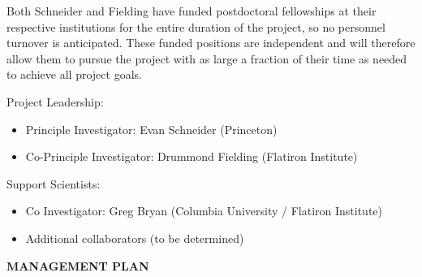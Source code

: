 \documentclass[11pt,letterpaper,english]{article}
\begin{document}
\begin{flushleft}
Both Schneider and Fielding have funded postdoctoral fellowships at their respective institutions for the entire duration of the project, so no personnel turnover is anticipated.  These funded positions are independent and will therefore allow them to pursue the project with as large a fraction of their time as needed to achieve all project goals.

Project Leadership:
\vspace{-.15in}
\begin{itemize}
\item Principle Investigator: Evan Schneider (Princeton) \\ 
\item Co-Principle Investigator: Drummond Fielding (Flatiron Institute) \\
\end{itemize} 

Support Scientists:
\vspace{-.15in}
\begin{itemize}
\item Co Investigator: Greg Bryan (Columbia University / Flatiron Institute) \\ 
\item Additional collaborators (to be determined)
\end{itemize} 

{\noindent \bf  {MANAGEMENT PLAN}}


\end{flushleft}
\end{document}
